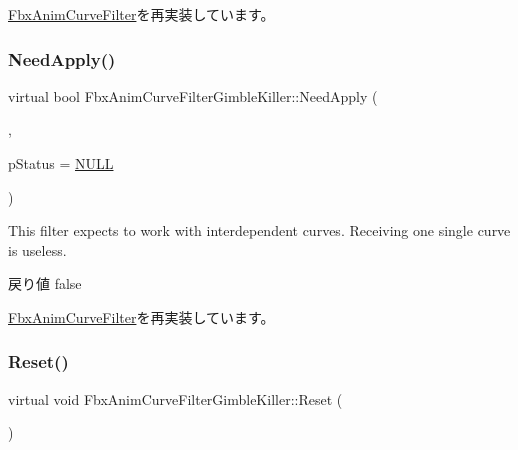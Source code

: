 \hyperlink{class_fbx_anim_curve_filter_a6b210eca45b745cf070c46bfaaf3e5b2}{Fbx\+Anim\+Curve\+Filter}を再実装しています。

\mbox{\label{class_fbx_anim_curve_filter_gimble_killer_a136dadcee53ebed6b5afc6abddfcf402}} 
\subsubsection{\texorpdfstring{Need\+Apply()}{NeedApply()}\hspace{0.1cm}{\footnotesize\ttfamily [5/5]}}
{\footnotesize\ttfamily virtual bool Fbx\+Anim\+Curve\+Filter\+Gimble\+Killer\+::\+Need\+Apply (\begin{DoxyParamCaption}\item[{\hyperlink{class_fbx_anim_curve}{Fbx\+Anim\+Curve} \&}]{,  }\item[{\hyperlink{class_fbx_status}{Fbx\+Status} $\ast$}]{p\+Status = {\ttfamily \hyperlink{fbxarch_8h_a070d2ce7b6bb7e5c05602aa8c308d0c4}{N\+U\+LL}} }\end{DoxyParamCaption})\hspace{0.3cm}{\ttfamily [virtual]}}

This filter expects to work with interdependent curves. Receiving one single curve is useless. \begin{DoxyReturn}{戻り値}
{\ttfamily false} 
\end{DoxyReturn}


\hyperlink{class_fbx_anim_curve_filter_af768a9c47e4f5a5fff47a8ec781e6b4c}{Fbx\+Anim\+Curve\+Filter}を再実装しています。

\mbox{\label{class_fbx_anim_curve_filter_gimble_killer_ad0c8bbf400bc208412b088d9c5b702a5}} 
\subsubsection{\texorpdfstring{Reset()}{Reset()}}
{\footnotesize\ttfamily virtual void Fbx\+Anim\+Curve\+Filter\+Gimble\+Killer\+::\+Reset (\begin{DoxyParamCaption}{ }\end{DoxyParamCaption})\hspace{0.3cm}{\ttfamily [virtual]}}

